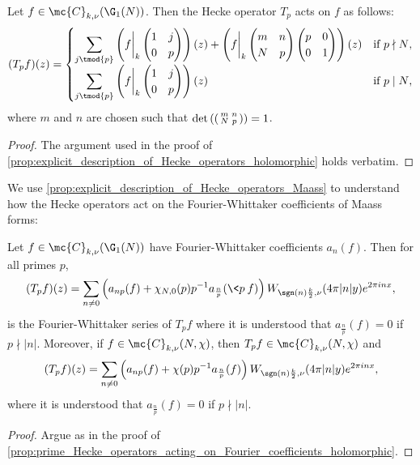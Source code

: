     \begin{proposition}\label{prop:explicit_description_of_Hecke_operators_Maass}
      Let $f \in \mc{C}_{k,\nu}(\G_{1}(N))$. Then the Hecke operator $T_{p}$ acts on $f$ as follows:
      \[
        (T_{p}f)(z) = \begin{cases} \displaystyle{\sum_{j \tmod{p}}}\left(f\bigg|_{k}\begin{pmatrix} 1 & j \\ 0 & p \end{pmatrix}\right)(z)+\left(f\bigg|_{k}\begin{pmatrix} m & n \\ N & p \end{pmatrix}\begin{pmatrix} p & 0 \\ 0 & 1 \end{pmatrix}\right)(z) & \text{if $p \nmid N$}, \\ \displaystyle{\sum_{j \tmod{p}}}\left(f\bigg|_{k}\begin{pmatrix} 1 & j \\ 0 & p \end{pmatrix}\right)(z) & \text{if $p \mid N$}, \end{cases}
      \]
      where $m$ and $n$ are chosen such that $\det\left(\begin{psmallmatrix} m & n \\ N & p \end{psmallmatrix}\right) = 1$.
    \end{proposition}
    \begin{proof}
      The argument used in the proof of \cref{prop:explicit_description_of_Hecke_operators_holomorphic} holds verbatim.
    \end{proof}

    We use \cref{prop:explicit_description_of_Hecke_operators_Maass} to understand how the Hecke operators act on the Fourier-Whittaker coefficients of Maass forms:

    \begin{proposition}\label{prop:prime_Hecke_operators_acting_on_Fourier_coefficients_Maass}
      Let $f \in \mc{C}_{k,\nu}(\G_{1}(N))$ have Fourier-Whittaker coefficients $a_{n}(f)$. Then for all primes $p$,
      \[
        (T_{p}f)(z) = \sum_{n \neq 0}\left(a_{np}(f)+\chi_{N,0}(p)p^{-1}a_{\frac{n}{p}}(\<p\>f)\right)W_{\sgn(n)\frac{k}{2},\nu}(4\pi|n|y)e^{2\pi inx},
      \]
      is the Fourier-Whittaker series of $T_{p}f$ where it is understood that $a_{\frac{n}{p}}(f) = 0$ if $p \nmid |n|$. Moreover, if $f \in \mc{C}_{k,\nu}(N,\chi)$, then $T_{p}f \in \mc{C}_{k,\nu}(N,\chi)$ and
      \[
        (T_{p}f)(z) = \sum_{n \neq 0}\left(a_{np}(f)+\chi(p)p^{-1}a_{\frac{n}{p}}(f)\right)W_{\sgn(n)\frac{k}{2},\nu}(4\pi|n|y)e^{2\pi inx},
      \]
      where it is understood that $a_{\frac{n}{p}}(f) = 0$ if $p \nmid |n|$.
    \end{proposition}
    \begin{proof}
      Argue as in the proof of \cref{prop:prime_Hecke_operators_acting_on_Fourier_coefficients_holomorphic}.
    \end{proof}

